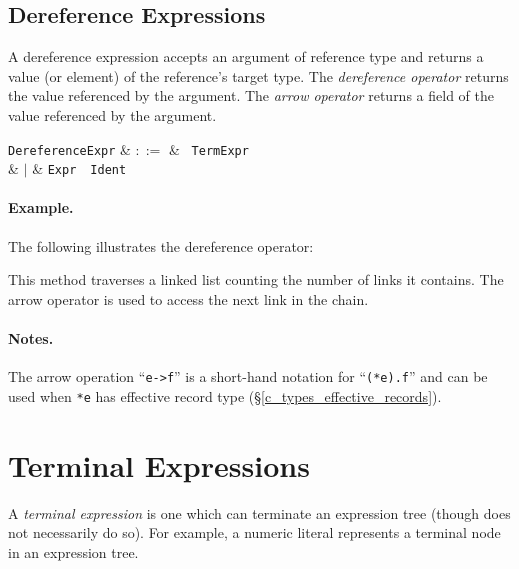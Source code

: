 
\subsection{Dereference Expressions}
\label{c_expr_dereference}

A dereference expression accepts an argument of reference type and returns a value (or element) of the reference's target type.  The {\em dereference operator} returns the value referenced by the argument.  The {\em arrow operator} returns a field of the value referenced by the argument.

\begin{syntax}
  \verb+DereferenceExpr+ & $::=$ & \token{*}\ \verb+TermExpr+\\
  & $|$ & \verb+Expr+\ \token{->}\ \verb+Ident+\\
\end{syntax}

\paragraph{Example.} The following illustrates the dereference operator:



This method traverses a linked list counting the number of links it contains.  The arrow operator is used to access the next link in the chain.

\paragraph{Notes.} The arrow operation ``\lstinline{e->f}'' is a short-hand notation for ``\lstinline{(*e).f}'' and can be used when \lstinline{*e} has effective record type (\S\ref{c_types_effective_records}).



\section{Terminal Expressions}
\label{c_expr_term}

A {\em terminal expression} is one which can terminate an expression tree (though does not necessarily do so).  For example, a numeric literal represents a terminal node in an expression tree.

